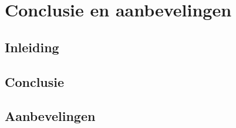 \chapter{Conclusie en aanbevelingen}
\section{Inleiding}

\section{Conclusie}

\section{Aanbevelingen}